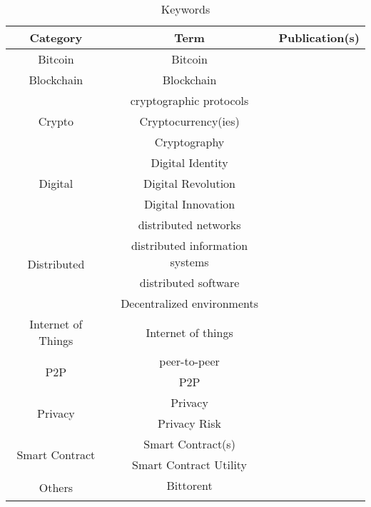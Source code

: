 \begin{longtable}{ |c|c|p{4cm}| }
	\caption{Keywords} \\
	\hline
 	\textbf{Category} & \textbf{Term} & \textbf{Publication(s)} \\ [0.5ex] 
 	\hline\hline
 	\endhead
 	Bitcoin & Bitcoin & \cite{2016_Jacynycz,2017_Ouaddah,2015_Zyskind}\\ 
	 \hline
	 Blockchain & Blockchain & \cite{2018_Alessandra,2016_Bahga,2017_Coyne,2015_Dennis,2017_Gipp,2016_Jacynycz,2017_Madhwal,2017_Naerland,2017_Ouaddah,2016_Sharples,2016_Tian,2016_Yasin,2016_Yue,2015_Zyskind}\\ 
	 \hline
	 \multirow{3}{*}{Crypto} & cryptographic protocols & \cite{2016_Azaria,2015_Dennis} \\ \cline{2-3}
	 & Cryptocurrency(ies) & \cite{2016_Jacynycz,2017_Ouaddah}\\ \cline{2-3}
	 & Cryptography & \cite{2016_Kianmajd}\\
	 \hline
	  \multirow{3}{*}{Digital} & Digital Identity & \cite{2016_Yasin}\\ \cline{2-3}
	  & Digital Revolution & \multirow{2}{*}{\cite{2018_Alessandra}} \\ \cline{2-2}
	  & Digital Innovation & \\
	 \hline
	 \multirow{4}{*}{Distributed} & distributed networks & \cite{2015_Dennis}\\ \cline{2-3}
	  & distributed information systems
& \cite{2016_Azaria}\\ \cline{2-3}
	  & distributed software & \cite{2016_Jacynycz}\\ \cline{2-3}
	  & Decentralized environments & \cite{2017_Naerland} \\
	 \hline
 	Internet of Things & Internet of things & \cite{2016_Bahga,2017_Jaag,2016_Kianmajd}\\ 
	 \hline
	  \multirow{2}{*}{P2P} & peer-to-peer & \cite{2015_Dennis}\\ \cline{2-3} 
	  & P2P & \cite{2016_Jacynycz}\\
	 \hline
	 \multirow{2}{*}{Privacy} & Privacy & \cite{2017_Ouaddah,2015_Zyskind}\\  \cline{2-3}
	 & Privacy Risk & \cite{2016_Yue} \\
	 \hline
	 \multirow{2}{*}{Smart Contract} & Smart Contract(s) & \cite{2016_Bahga,2016_Jacynycz}\\ \cline{2-3}
	 & Smart Contract Utility & \cite{2016_Yasin} \\
	 \hline
	 \multirow{14}{*}{Others} & Bittorent  & \cite{2015_Dennis} \\ \cline{2-3}

\end{longtable}
